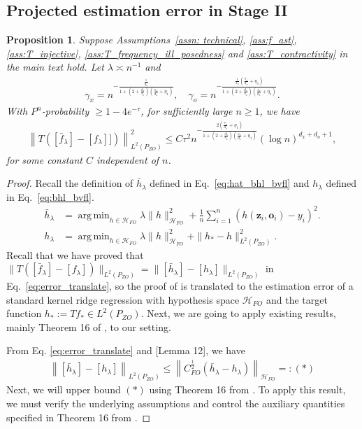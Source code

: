 \documentclass[11pt]{article}
\newcommand{\bz}{\mathbf z}
\newcommand{\bo}{\mathbf o}
\newcommand{\calH}{\mathcal{H}}
\newcommand{\0}{\mathbf{0}}
\DeclareMathOperator*{\argmin}{arg\,min}
\newtheorem{prop}{Proposition}[section]
\begin{document}
\begin{appendix}
\subsection{Projected estimation error in Stage II}
\label{sec:esti_main}
\begin{prop}
\label{prop: projected_est_error}
Suppose Assumptions~\ref{assn: technical}, \ref{ass:f_ast}, \ref{ass:T_injective}, \ref{ass:T_frequency_ill_posedness} and \ref{ass:T_contractivity} in the main text hold. 
Let $\lambda \asymp n^{-1}$ and 
\begin{align*}
    \gamma_x = n^{-\frac{\frac{1}{d_x}}{1+(2+\frac{d_o}{s_o})(\frac{s_x}{d_x}+\eta_1)}}, \quad \gamma_o = n^{-\frac{\frac{1}{s_o}(\frac{s_x}{d_x}+\eta_1)}{1+(2+\frac{d_o}{s_o})(\frac{s_x}{d_x}+\eta_1)}}. 
\end{align*} With $P^n$-probability $\geq 1-  4e^{-\tau}$, for sufficiently large $n\geq 1$, we have
\begin{align*}
\left\|T\left(\left[\bar{f}_{\lambda}\right] - [f_{\lambda}]]\right)\right\|_{L^2(P_{ZO})}^2 \leq C \tau^2 n^{-\frac{2(\frac{s_x}{d_x}+\eta_1)}{1+(2+\frac{d_o}{s_o})(\frac{s_x}{d_x}+\eta_1)}} (\log n)^{d_x+d_o+1},
\end{align*}
for some constant $C$ independent of $n$.
\end{prop}
\begin{proof}
Recall the definition of $\bar{h}_{\lambda}$ defined in Eq.~\eqref{eq:hat_bhl_bvfl} and $h_\lambda$ defined in Eq.~\eqref{eq:bhl_bvfl}.
\begin{align*}
    \bar{h}_{\lambda} &= \argmin_{h\in \calH_{FO}}\lambda \|h\|_{\calH_{FO}}^2 + \frac{1}{n}\sum_{i=1}^{n}(h(\bz_i,\bo_i) - y_i)^2 . \\
    h_{\lambda} &= \argmin_{h\in\calH_{FO}}\lambda \|h\|^2_{\calH_{FO}} + \|h_{\ast} - h\|^2_{L^2(P_{ZO})}.
\end{align*} 
Recall that we have proved that $\|T([\bar{f}_{\lambda}] - [f_{\lambda}])\|_{L^2(P_{ZO})} = \|[\bar{h}_{\lambda}] - [h_{\lambda}] \|_{L^2(P_{ZO})}$ in Eq.~\eqref{eq:error_translate}, so the proof of  is translated to the estimation error of a standard kernel ridge regression with hypothesis space $\calH_{FO}$ and the target function $h_\ast := T f_\ast \in L^2(P_{ZO})$. Next, we are going to apply existing results, mainly Theorem 16 of \cite{fischer2020sobolev}, to our setting.

From Eq. \eqref{eq:error_translate} and \cite{fischer2020sobolev}[Lemma 12], we have
\begin{align}
\label{eq:prop_first_line_TFF}
     \left\| [\bar{h}_{\lambda}] - [h_{\lambda}]\right\|_{L^2(P_{ZO})} \leq \left\|C_{FO}^{\frac{1}{2}}\left(\bar{h}_{\lambda} - h_{\lambda}\right)\right\|_{\calH_{FO}} =: (\ast)
\end{align}
Next, we will upper bound $(\ast)$ using Theorem 16 from \citet{fischer2020sobolev}. To apply this result, we must verify the underlying assumptions and control the auxiliary quantities specified in Theorem 16 from \citet{fischer2020sobolev}. 


\end{proof}
\end{appendix}
\end{document}
